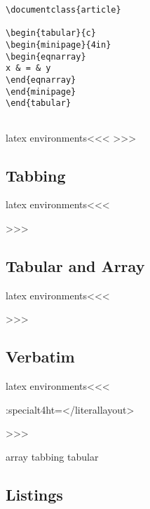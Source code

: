 \begin{verbatim}
\documentclass{article}  
    
\begin{tabular}{c}  
\begin{minipage}{4in}  
\begin{eqnarray}  
x & = & y  
\end{eqnarray}  
\end{minipage}  
\end{tabular}    
  
\end{verbatim}




\<latex environments\><<<
   {\IgnorePar\EndP{}}
   {\IgnorePar\EndP{}\ShowPar}
   {}{}
>>>

\subsection{Tabbing}

\<latex environments\><<<

>>>

\subsection{Tabular and Array}

\<latex environments\><<<

>>>

\subsection{Verbatim}

\<latex environments\><<<
  {\ifinner\else \vfill\break\fi
    \IgnorePar\EndP{}\EndNoFonts}
  {\NoFonts \ht:special{t4ht=</literallayout>}\ShowPar\par}
  {} {}
  {\ifinner\else \vfill\break\fi
    \IgnorePar\EndP{}\EndNoFonts}
  {\NoFonts {}\ShowPar\par}
  {} {}
>>>

    array
    tabbing
    tabular
 

\subsection{Listings}

